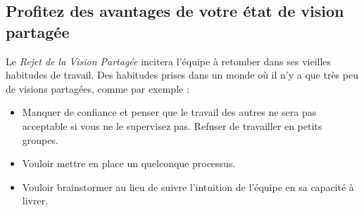 \documentclass[paper=6in:9in,pagesize=pdftex,headinclude=on,footinclude=on,12pt]{scrbook}
\begin{document}
\subsection{Profitez des avantages de votre état de vision partagée}

Le \emph{Rejet de la Vision Partagée} incitera l'équipe à retomber dans ses vieilles habitudes de travail. Des
habitudes prises dans un monde où il n'y a que très peu de visions partagées, comme par exemple :
\begin{itemize}
	\item Manquer de confiance et penser que le travail des autres ne sera pas acceptable si vous ne le supervisez
	      pas. Refuser de travailler en petits groupes.
	\item Vouloir mettre en place un quelconque processus.
	\item Vouloir \og{}brainstormer\fg{} au lieu de suivre l'intuition de l'équipe en sa capacité à livrer.
\end{itemize}
\end{document}
